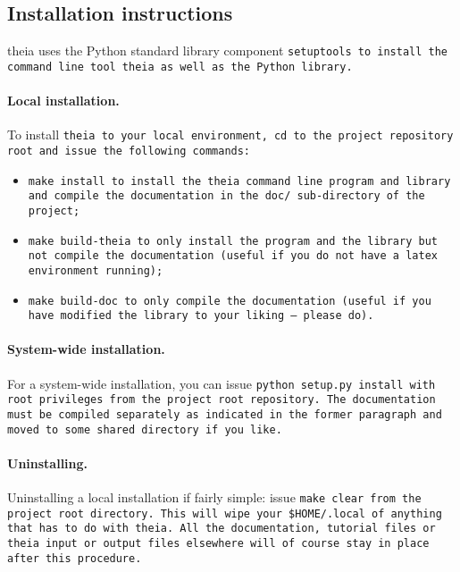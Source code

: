 \documentclass{article}
\begin{document}
\subsection{Installation instructions}
theia uses the Python standard library component \tt{setuptools} to install the command line tool \tt{theia} as well as the Python library.

\paragraph{Local installation.}To install \tt{theia} to your local environment, \tt{cd} to the project repository root and issue the following commands:

\begin{itemize}
\item \tt{make install} to install the \tt{theia} command line program and library and compile the documentation in the \tt{doc/} sub-directory of the project;
\item \tt{make build-theia} to only install the program and the library but not compile the documentation (useful if you do not have a latex environment running);
\item \tt{make build-doc} to only compile the documentation (useful if you have modified the library to your liking -- please do).
\end{itemize}


\paragraph{System-wide installation.}For a system-wide installation, you can issue \tt{python setup.py install} with root privileges from the project root repository. The documentation must be compiled separately as indicated in the former paragraph and moved to some shared directory if you like.

\paragraph{Uninstalling.} Uninstalling a local installation if fairly simple: issue \tt{make clear} from the project root directory. This will wipe your \tt{\$HOME/.local} of anything that has to do with \tt{theia}. All the documentation, tutorial files or \tt{theia} input or output files elsewhere will of course stay in place after this procedure.
\end{document}
